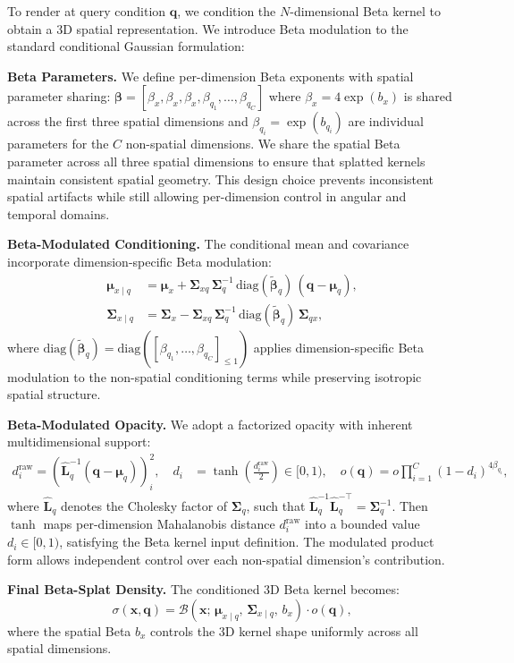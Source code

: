 \documentclass{article} %
\begin{document}
To render at query condition $\bm{q}$, we condition the $N$-dimensional Beta kernel to obtain a 3D spatial representation. We introduce Beta modulation to the standard conditional Gaussian formulation:

\textbf{Beta Parameters.} We define per-dimension Beta exponents with spatial parameter sharing: $\bm{\beta} = [\beta_x, \beta_x, \beta_x, \beta_{q_1}, \ldots, \beta_{q_C}]$ where $\beta_x = 4\exp(b_x)$ is shared across the first three spatial dimensions and $\beta_{q_i} = \exp(b_{q_i})$ are individual parameters for the $C$ non-spatial dimensions. We share the spatial Beta parameter across all three spatial dimensions to ensure that splatted kernels maintain consistent spatial geometry. This design choice prevents inconsistent spatial artifacts while still allowing per-dimension control in angular and temporal domains.

\textbf{Beta-Modulated Conditioning.} The conditional mean and covariance incorporate dimension-specific Beta modulation:
\begin{align}
\bm{\mu}_{x\mid q} &= \bm{\mu}_x + \bm{\Sigma}_{xq}\,\bm{\Sigma}_q^{-1}\,\text{diag}(\bm{\tilde{\beta}}_q)\,(\bm{q}-\bm{\mu}_q), \\
\bm{\Sigma}_{x\mid q} &= \bm{\Sigma}_x - \bm{\Sigma}_{xq}\,\bm{\Sigma}_q^{-1}\,\text{diag}(\bm{\tilde{\beta}}_q)\,\bm{\Sigma}_{qx},
\end{align}
where $\text{diag}(\bm{\tilde{\beta}}_q) = \text{diag}([\beta_{q_1}, \ldots, \beta_{q_C}]_{\leq1})$ applies dimension-specific Beta modulation to the non-spatial conditioning terms while preserving isotropic spatial structure.

\textbf{Beta-Modulated Opacity.} We adopt a factorized opacity with inherent multidimensional support:
\begin{align}
d_i^{\text{raw}} = (\hat{\bm{L}}_{q}^{-1}(\bm{q}-\bm{\mu}_q))^2_i, \quad
d_i &= \tanh{(\frac{d_i^{\text{raw}}}{2})} \in[0,1),\quad 
o(\bm{q}) = o \prod_{i=1}^{C} (1- d_i)^{4\beta_{q_i}},
\end{align}
where $\hat{\bm{L}}_{q}$ denotes the Cholesky factor of $\bm{\Sigma}_q$, such that $\hat{\bm{L}}_{q}^{-1}\hat{\bm{L}}_{q}^{-\top}=\bm{\Sigma}_q^{-1}$. Then $\tanh$ maps per-dimension Mahalanobis distance $d_i^{\text{raw}}$ into a bounded value $d_i \in [0,1)$, satisfying the Beta kernel input definition. The modulated product form allows independent control over each non-spatial dimension's contribution.

\textbf{Final Beta-Splat Density.} The conditioned 3D Beta kernel becomes:
\begin{equation}
\sigma(\bm{x}, \bm{q}) = \mathcal{B}\!\left(\bm{x};\, \bm{\mu}_{x\mid q},\, \bm{\Sigma}_{x\mid q},\, b_x\right) \cdot o(\bm{q}),
\end{equation}
where the spatial Beta $b_x$ controls the 3D kernel shape uniformly across all spatial dimensions.
\end{document}
